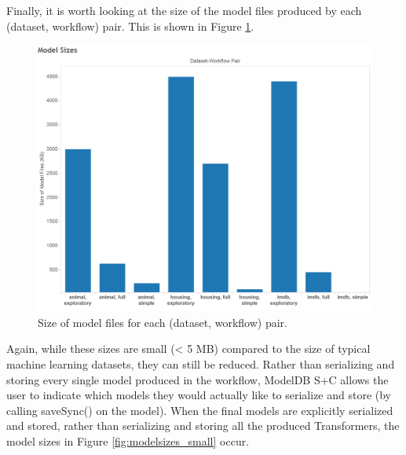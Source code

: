 Finally, it is worth looking at the size of the model files produced by each (dataset, workflow) pair. This is shown in
Figure \ref{fig:modelsizes}.

\begin{figure}
  \centering
  \includegraphics[width=5.0in]{modelsizes}
  \caption{
    Size of model files for each (dataset, workflow) pair.
  }
  \label{fig:modelsizes}
\end{figure}

Again, while these sizes are small (< 5 MB) compared to the size of typical machine learning
datasets, they can still be reduced. Rather than serializing and storing every single model produced in the 
workflow, ModelDB S+C allows the user to indicate which models they would actually like to serialize and store (by
calling saveSync() on the model). When the final models are explicitly serialized and stored, rather than serializing and storing
all the produced Transformers, the model sizes in Figure \ref{fig:modelsizes_small} occur. 

